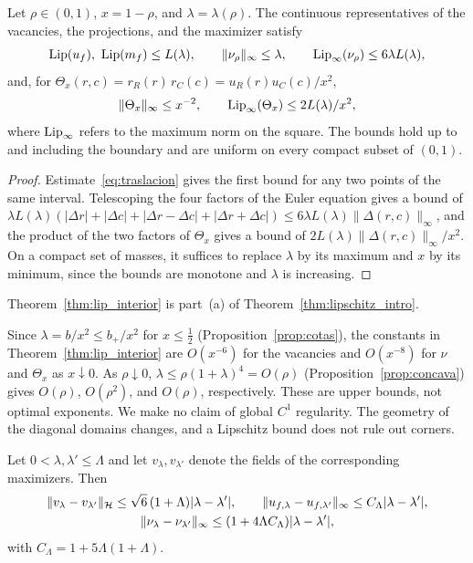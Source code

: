 \begin{teorema}\label{thm:lip_interior} Let $\rho\in(0,1)$, $x=1-\rho$, and $\lambda=\lambda(\rho)$. The
continuous representatives of the vacancies, the projections, and the maximizer satisfy \[
 \Lip(u_f),\ \Lip(m_f)\le L(\lambda),\qquad \|\nu_\rho\|_\infty\le\lambda,\qquad
 \Lip_\infty(\nu_\rho)\le6\lambda L(\lambda),
\] and, for $\Theta_x(r,c)=r_R(r)\,r_C(c)=u_R(r)u_C(c)/x^2$, \[
 \|\Theta_x\|_\infty\le x^{-2},\qquad \operatorname{Lip}_\infty(\Theta_x)\le2L(\lambda)/x^2 ,
\] where $\operatorname{Lip}_\infty$ refers to the maximum norm on the square. The bounds hold up to and including the boundary and are uniform on every
compact subset of $(0,1)$. \end{teorema}

\begin{proof} Estimate~\eqref{eq:traslacion} gives the first bound for any two points of the same interval. Telescoping the four
factors of the Euler equation gives a bound of $\lambda L(\lambda)(|\Delta r|+|\Delta c|+|\Delta r-\Delta c|+|\Delta r+\Delta
c|)\le6\lambda L(\lambda)\|\Delta(r,c)\|_\infty$, and the product of the two factors of $\Theta_x$ gives a bound of
$2L(\lambda)\|\Delta(r,c)\|_\infty/x^2$. On a compact set of masses, it suffices to replace $\lambda$ by its maximum and $x$ by its
minimum, since the bounds are monotone and $\lambda$ is increasing. \end{proof}

Theorem~\ref{thm:lip_interior} is part~(a) of Theorem~\ref{thm:lipschitz_intro}.

\begin{observacion}\label{obs:degeneracion} Since $\lambda=b/x^2\le b_+/x^2$ for $x\le\frac12$
(Proposition~\ref{prop:cotas}), the constants in Theorem~\ref{thm:lip_interior} are $O(x^{-6})$ for the vacancies and $O(x^{-8})$ for
$\nu$ and $\Theta_x$ as $x\downarrow0$. As $\rho\downarrow0$, $\lambda\le\rho(1+\lambda)^4=O(\rho)$ (Proposition~\ref{prop:concava})
gives $O(\rho)$, $O(\rho^2)$, and $O(\rho)$, respectively. These are upper bounds, not optimal exponents. We
make no claim of global $C^1$ regularity. The geometry of the diagonal domains changes, and a Lipschitz bound does not rule out corners.
\end{observacion}

\begin{proposicion}\label{prop:actividad} Let $0<\lambda,\lambda'\le\Lambda$ and let $v_\lambda,v_{\lambda'}$
denote the fields of the corresponding maximizers. Then \begin{gather*}
 \|v_\lambda-v_{\lambda'}\|_{\mathcal{H}}\le\sqrt6\,(1+\Lambda)|\lambda-\lambda'|,\qquad
 \|u_{f,\lambda}-u_{f,\lambda'}\|_\infty\le C_\Lambda|\lambda-\lambda'|,\\
 \|\nu_\lambda-\nu_{\lambda'}\|_\infty\le(1+4\Lambda C_\Lambda)|\lambda-\lambda'|,
\end{gather*} with $C_\Lambda=1+5\Lambda(1+\Lambda)$. \end{proposicion}


